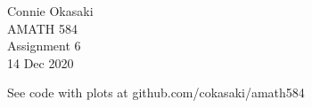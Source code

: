 \documentclass[letter, 12pt]{article}
\begin{document}
\parindent=0in
\newenvironment{problem}[1][]
   {\begin{framed} \textbf{Problem \theprobnum: #1}}
   {\end{framed}\stepcounter{probnum}}
\newenvironment{bookproblem}[1]
   {\begin{framed} \textbf{Problem #1:}}
   {\end{framed}\stepcounter{probnum}}

\begin{flushright}
Connie Okasaki \\
AMATH 584\\
Assignment 6\\
14 Dec 2020
\end{flushright}

See code with plots at github.com/cokasaki/amath584
\end{document}
